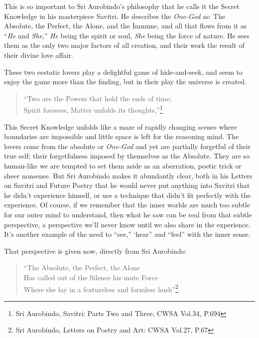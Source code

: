 \documentclass[12pt,a4paper]{book}
\begin{document}
This is so important to Sri Aurobindo's philosophy that he calls it
the Secret Knowledge in his masterpiece Savitri. He describes the
\emph{One-God} as: The Absolute, the Perfect, the Alone, and the
Immune, and all that flows from it as ``\emph{He} and \emph{She},''
\emph{He} being the spirit or soul, \emph{She} being the force of
nature. He sees them as the only two major factors of all creation,
and their work the result of their divine love affair.

These two ecstatic lovers play a delightful game of hide-and-seek, and
seem to enjoy the game more than the finding, but in their play the
universe is created.

\begin{verse}
``Two are the Powers that hold the ends of time;\\ Spirit foresees,
  Matter unfolds its thoughts,''\footnote{Sri Aurobindo, Savitri:
    Parts Two and Three, CWSA Vol.34, P.694}
\end{verse}

This Secret Knowledge unfolds like a maze of rapidly changing scenes
where boundaries are impossible and little space is left for the
reasoning mind. The lovers come from the absolute or \emph{One-God}
and yet are partially forgetful of their true self; their
forgetfulness imposed by themselves as the Absolute. They are so
human-like we are tempted to set them aside as an aberration, poetic
trick or sheer nonsense. But Sri Aurobindo makes it abundantly clear,
both in his Letters on Savitri and Future Poetry that he would never
put anything into Savitri that he didn't experience himself, or use a
technique that didn't fit perfectly with the experience. Of course, if
we remember that the inner worlds are much too subtle for our outer
mind to understand, then what he saw can be real from that subtle
perspective, a perspective we'll never know until we also share in the
experience. It's another example of the need to ``see,'' ‘hear'' and
``feel'' with the inner sense.

\noindent That perspective is given now, directly from Sri Aurobindo:

\begin{verse}
``The Absolute, the Perfect, the Alone\\
Has called out of the Silence his mute Force\\
Where she lay in a featureless and formless hush''\footnote{Sri Aurobindo, Letters on Poetry and Art: CWSA Vol.27, P.67}
\end{verse}
\end{document}
